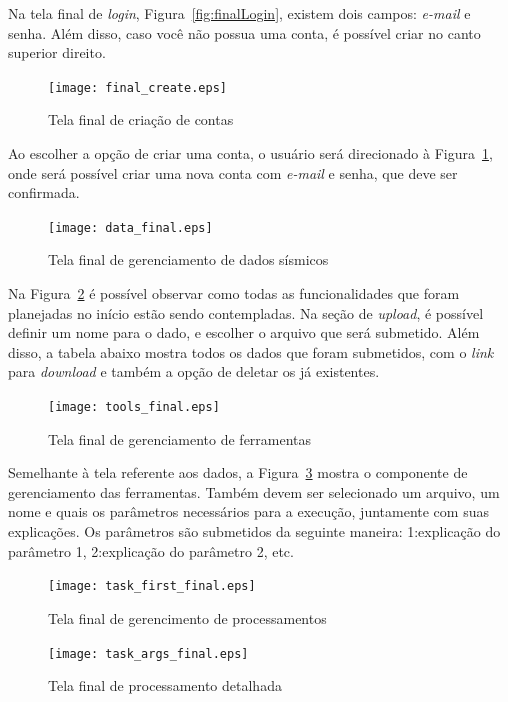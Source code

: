 \documentclass[11pt,twoside]{article}
\begin{document}
Na tela final de \emph{login}, Figura~\ref{fig:finalLogin}, existem dois campos: \emph{e-mail} e senha. Além disso, caso você não possua uma conta, é possível criar no canto superior direito.

\begin{figure}[!h]
  \centering
  \texttt{[image: final\_create.eps]}
  \caption{Tela final de criação de contas}
  \label{fig:finalCreate}
\end{figure}

 Ao escolher a opção de criar uma conta, o usuário será direcionado à Figura~\ref{fig:finalCreate}, onde será possível criar uma nova conta com \emph{e-mail} e senha, que deve ser confirmada.

\begin{figure}[!h]
  \centering
  \texttt{[image: data\_final.eps]}
  \caption{Tela final de gerenciamento de dados sísmicos}
  \label{fig:finalData}
\end{figure}

Na Figura~\ref{fig:finalData} é possível observar como todas as funcionalidades que foram planejadas no início estão sendo contempladas. Na seção de \emph{upload}, é possível definir um nome para o dado, e escolher o 
arquivo que será submetido. Além disso, a tabela abaixo mostra todos os dados que foram submetidos, com o \emph{link} para \emph{download} e também a opção de deletar os já existentes.

\begin{figure}[!h]
  \centering
  \texttt{[image: tools\_final.eps]}
  \caption{Tela final de gerenciamento de ferramentas}
  \label{fig:finalTools}
\end{figure}

Semelhante à tela referente aos dados, a Figura~\ref{fig:finalTools} mostra o componente de gerenciamento das ferramentas. Também devem
ser selecionado um arquivo, um nome e quais os parâmetros necessários para a execução, juntamente com suas explicações. Os parâmetros são submetidos da seguinte maneira: 1:explicação do parâmetro 1,
2:explicação do parâmetro 2, etc.

\begin{figure}[!h]
  \centering
  \texttt{[image: task\_first\_final.eps]}
  \caption{Tela final de gerencimento de processamentos}
  \label{fig:finalTasks}
\end{figure}

\begin{figure}[!h]
  \centering
  \texttt{[image: task\_args\_final.eps]}
  \caption{Tela final de processamento detalhada}
  \label{fig:finalDetailedTask}
\end{figure}
\end{document}
